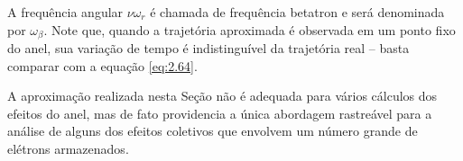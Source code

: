 A frequência angular $\nu \omega_r$ é chamada de frequência betatron e será denominada por $\omega_\beta$. Note que, quando a trajetória aproximada é observada em um ponto fixo do anel, sua variação de tempo é indistinguível da trajetória real -- basta comparar com a equação \eqref{eq:2.64}.

A aproximação realizada nesta Seção não é adequada para vários cálculos dos efeitos do anel, mas de fato providencia a única abordagem rastreável para a análise de alguns dos efeitos coletivos que envolvem um número grande de elétrons armazenados.